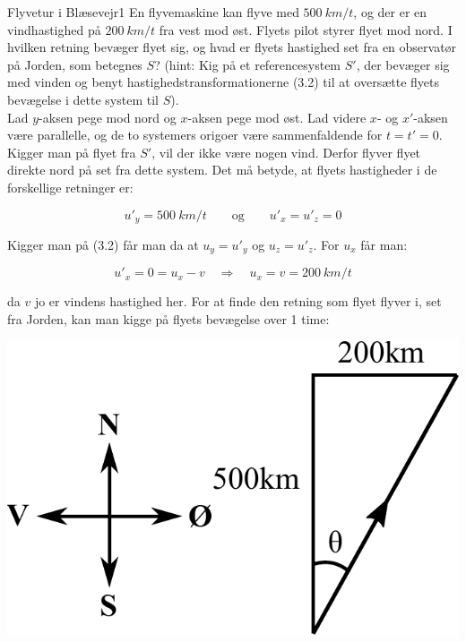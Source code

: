 \documentclass[crop=false, class=memoir]{standalone}
\begin{document}
\begin{opgave}{Flyvetur i Blæsevejr}{1}
	En flyvemaskine kan flyve med  $\SI{500}{km/t}$, og der er en vindhastighed på $\SI{200}{km/t}$ fra vest mod øst.
	\opg Flyets pilot styrer flyet mod nord. I hvilken retning bevæger flyet sig, og hvad er flyets hastighed set fra en observatør på Jorden, som betegnes $S$? (hint: Kig på et referencesystem $S'$, der bevæger sig med vinden og benyt hastighedstransformationerne (3.2) til at oversætte flyets bevægelse i dette system til $S$).\\
	
	Lad $y$-aksen pege mod nord og $x$-aksen pege mod øst. Lad videre $x$- og $x'$-aksen være parallelle, og de to systemers origoer være sammenfaldende for $t=t'=0$. Kigger man på flyet fra $S'$, vil der ikke være nogen vind. Derfor flyver flyet direkte nord på set fra dette system. Det må betyde, at flyets hastigheder i de forskellige retninger er:
	
	$$u'_y = \SI{500}{km/t} \quad \quad \text{og} \quad \quad u'_x = u'_z = 0$$
	
	\vspace{2mm}
	
	Kigger man på (3.2) får man da at $u_y = u'_y$ og $u_z = u'_z$. For $u_x$ får man:
	
	$$u'_x = 0 = u_x - v \quad \Rightarrow \quad u_x = v = \SI{200}{km/t}$$
	
	\vspace{2mm}
	
	da $v$ jo er vindens hastighed her. For at finde den retning som flyet flyver i, set fra Jorden, kan man kigge på flyets bevægelse over 1 time:
	
	\begin{center}
		\includegraphics[scale=0.8]{Rel/fly_fig.pdf}
	\end{center}
	

\end{opgave}
\end{document}
